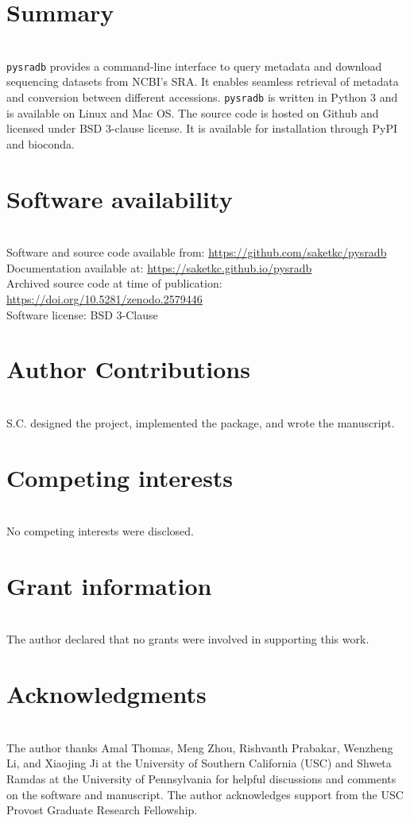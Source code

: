 \documentclass[9pt,a4paper]{extarticle}
\begin{document}
\section*{Summary} %
~\\
\texttt{pysradb} provides a command-line interface to query metadata and download
sequencing datasets from NCBI's SRA. It enables seamless retrieval of metadata
and conversion between different accessions. \texttt{pysradb} is written in Python 3
and is available on Linux and Mac OS. The source code is hosted on Github and licensed
under BSD 3-clause license. It is available for installation through PyPI and bioconda.
~\\
\section*{Software availability}
~\\
Software and source code available from: \url{https://github.com/saketkc/pysradb}
~\\
Documentation available at: \url{https://saketkc.github.io/pysradb}
~\\
Archived source code at time of publication: \url{https://doi.org/10.5281/zenodo.2579446}
~\\
Software license: BSD 3-Clause
~\\
\section*{Author Contributions}
~\\
S.C. designed the project, implemented the package, and wrote the manuscript.
~\\
\section*{Competing interests}
~\\
No competing interests were disclosed.
~\\
\section*{Grant information}
~\\
The author declared that no grants were involved in supporting this work.
~\\
\section*{Acknowledgments}
~\\
The author thanks Amal Thomas, Meng Zhou, Rishvanth Prabakar, Wenzheng Li, and Xiaojing Ji at the University of Southern California (USC) and Shweta Ramdas at the University of Pennsylvania for helpful discussions and comments on the software and manuscript. The author acknowledges support from the USC Provost Graduate Research Fellowship. 
\end{document}
